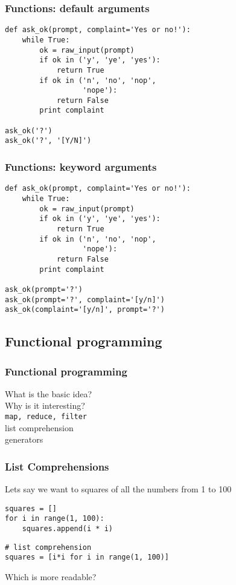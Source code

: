 \documentclass[14pt,compress]{beamer}
\newcounter{time}
\newcommand{\inctime}[1]{\addtocounter{time}{#1}{\tiny \thetime\ m}}
\newcommand{\typ}[1]{\texttt{#1}}
\begin{document}
\begin{frame}[fragile]
  \frametitle{Functions: default arguments}
  \small
  \begin{lstlisting}
def ask_ok(prompt, complaint='Yes or no!'):
    while True:
        ok = raw_input(prompt)
        if ok in ('y', 'ye', 'yes'): 
            return True
        if ok in ('n', 'no', 'nop',
                  'nope'): 
            return False
        print complaint

ask_ok('?')
ask_ok('?', '[Y/N]')
  \end{lstlisting}
\end{frame}

\begin{frame}[fragile]
  \frametitle{Functions: keyword arguments}
  \small
  \begin{lstlisting}
def ask_ok(prompt, complaint='Yes or no!'):
    while True:
        ok = raw_input(prompt)
        if ok in ('y', 'ye', 'yes'): 
            return True
        if ok in ('n', 'no', 'nop',
                  'nope'): 
            return False
        print complaint

ask_ok(prompt='?')
ask_ok(prompt='?', complaint='[y/n]')
ask_ok(complaint='[y/n]', prompt='?')
\end{lstlisting}
\inctime{15} 
\end{frame}

\subsection{Functional programming}
\begin{frame}[fragile]
    \frametitle{Functional programming}
What is the basic idea?\\
Why is it interesting?\\
\typ{map, reduce, filter}\\
list comprehension\\
generators
\end{frame}

\begin{frame}[fragile]
    \frametitle{List Comprehensions}
Lets say we want to squares of all the numbers from 1 to 100
    \begin{lstlisting}
squares = []
for i in range(1, 100):
    squares.append(i * i)
    \end{lstlisting}
    \begin{lstlisting}
# list comprehension
squares = [i*i for i in range(1, 100)]
     \end{lstlisting}
Which is more readable?
\end{frame}
\end{document}
